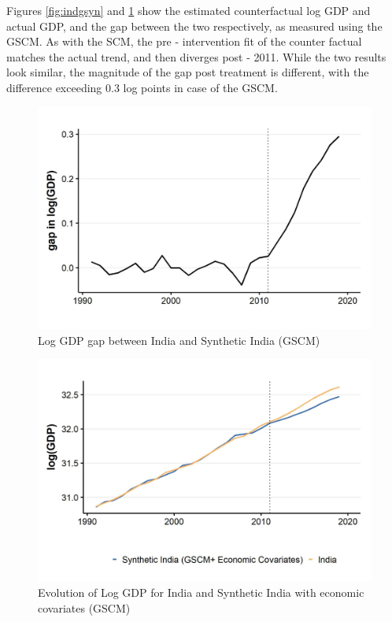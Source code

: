 \documentclass[12pt,nobind, a4paper]{reedthesis}
\begin{document}
 Figures \ref{fig:indgsyn} and \ref{fig:indgsyngap} show the estimated counterfactual log GDP and actual GDP, and the gap between the two respectively, as measured using the GSCM. As with the SCM, the pre - intervention fit of the counter factual matches the actual trend, and then diverges post - 2011. While the two results look similar, the magnitude of the gap post treatment is different, with the difference exceeding 0.3 log points in case of the GSCM.
 \begin{figure}

 {\centering \includegraphics[width=1\linewidth]{figure/indiagsynthgap} 

 }

 \caption{Log GDP gap between India and Synthetic India (GSCM)}\label{fig:indgsyngap}
 \end{figure}
 \begin{figure}

 {\centering \includegraphics[width=1\linewidth]{figure/indiagsynthc2} 

 }

 \caption{Evolution of Log GDP for India and Synthetic India with economic covariates (GSCM)}\label{fig:indgsync1}
 \end{figure}
\end{document}
